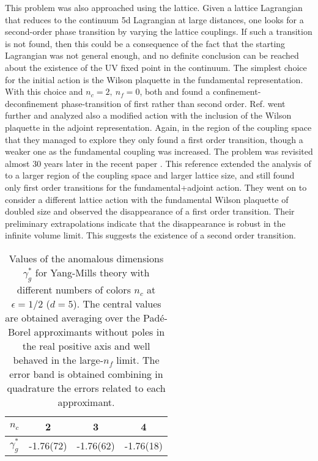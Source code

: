 \documentclass [11pt]{article}
\begin{document}
This problem was also approached using the lattice. Given a lattice Lagrangian that reduces to the continuum 5d Lagrangian at large distances, one looks for a second-order phase transition by varying the lattice couplings. If such a transition is not found, then this could be a consequence of the fact that the starting Lagrangian was not general enough, and no definite conclusion can be reached about the existence of the UV fixed point in the continuum. The simplest choice for the initial action is the Wilson plaquette in the fundamental representation. With this choice and $n_c=2,\ n_f=0$, both \cite{Creutz} and \cite{kwai} found a confinement-deconfinement phase-transition of first rather than second order. Ref. \cite{kwai} went further and analyzed also a modified action with the inclusion of the Wilson plaquette in the adjoint representation. Again, in the region of the coupling space that they managed to explore they only found a first order transition, though a weaker one as the fundamental coupling was increased. The problem was revisited almost 30 years later in the recent paper \cite{Florio:2021uoz}. This reference extended the analysis of \cite{kwai} to a larger region of the coupling space and larger lattice size, and still found only first order transitions for the fundamental+adjoint action. They went on to consider a different lattice action with the fundamental Wilson plaquette of doubled size and observed the disappearance of a first order transition. Their preliminary extrapolations indicate that the disappearance is robust in the infinite volume limit. This suggests the existence of a second order transition. 

 \begin{table} [t!]
 \centering
  \begin{tabular}{lccc}
    \hline
    $n_c$ & 2 & 3& 4 \\
      \hline    
    $\gamma_g^*$ &-1.76(72) &-1.76(62)  &  -1.76(18) \\
    \hline 
   \end{tabular}
   \caption{Values of the anomalous dimensions $\gamma_g^*$ for Yang-Mills theory with different numbers of colors $n_c$ at $\epsilon=1/2$ ($d=5$). The central values
are obtained averaging over the Pad\'e-Borel approximants without poles in the real positive axis and well behaved in the large-$n_f$ limit. The error band is obtained combining in quadrature the errors related to each approximant.} 
   \label{Tab:SUn}
\end{table}
 
\end{document}
